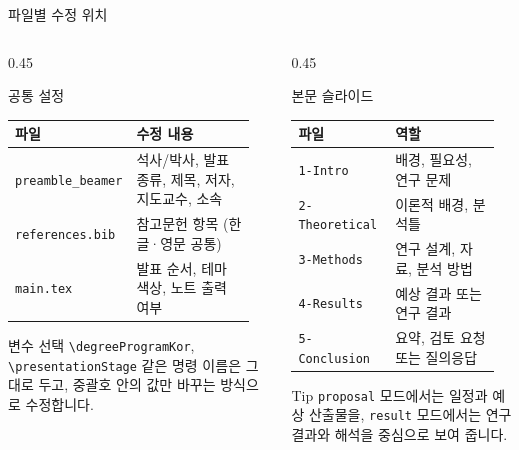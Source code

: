 \documentclass{KNUE_beamer_class}
\begin{document}
\begin{frame}[t]{파일별 수정 위치}
\tiny

\begin{columns}[T]
\begin{column}{0.45\textwidth}
\begin{block}{공통 설정}
\begin{tabular}{@{}p{0.38\linewidth}p{0.54\linewidth}@{}}
\toprule
\textbf{파일} & \textbf{수정 내용} \\
\midrule
\texttt{preamble\_beamer} & 석사/박사, 발표 종류, 제목, 저자, 지도교수, 소속 \\
\texttt{references.bib} & 참고문헌 항목 (한글·영문 공통) \\
\texttt{main.tex} & 발표 순서, 테마 색상, 노트 출력 여부 \\
\bottomrule
\end{tabular}
\end{block}

\begin{alertblock}{변수 선택}
\texttt{\textbackslash degreeProgramKor}, \texttt{\textbackslash presentationStage} 같은 명령 이름은 그대로 두고, 중괄호 안의 값만 바꾸는 방식으로 수정합니다.
\end{alertblock}
\end{column}

\begin{column}{0.45\textwidth}
\begin{block}{본문 슬라이드}
\begin{tabular}{@{}p{0.42\linewidth}p{0.50\linewidth}@{}}
\toprule
\textbf{파일} & \textbf{역할} \\
\midrule
\texttt{1-Intro} & 배경, 필요성, 연구 문제 \\
\texttt{2-Theoretical} & 이론적 배경, 분석틀 \\
\texttt{3-Methods} & 연구 설계, 자료, 분석 방법 \\
\texttt{4-Results} & 예상 결과 또는 연구 결과 \\
\texttt{5-Conclusion} & 요약, 검토 요청 또는 질의응답 \\
\bottomrule
\end{tabular}
\end{block}

\begin{exampleblock}{Tip}
\texttt{proposal} 모드에서는 일정과 예상 산출물을, \texttt{result} 모드에서는 연구 결과와 해석을 중심으로 보여 줍니다.
\end{exampleblock}
\end{column}
\end{columns}
\end{frame}
\end{document}
